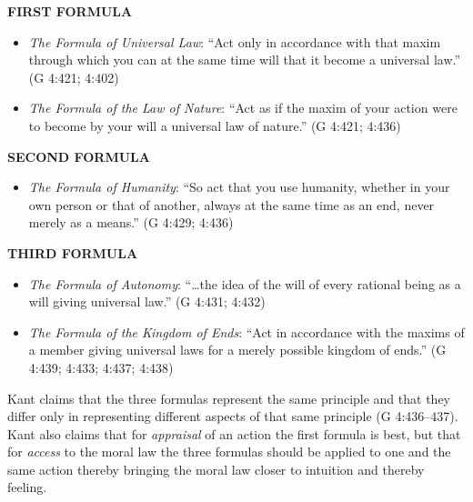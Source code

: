 \textbf{FIRST FORMULA}
\begin{itemize}
	\item \emph{The Formula of Universal Law}: ``Act only in accordance with that maxim through which you can at the same time will that it become a universal law.'' (G 4:421; 4:402)
	\item \emph{The Formula of the Law of Nature}: ``Act as if the maxim of your action were to become by your will a universal law of nature.'' (G 4:421; 4:436)
\end{itemize}
\textbf{SECOND FORMULA}
\begin{itemize}
	\item \emph{The Formula of Humanity}: ``So act that you use humanity, whether in your own person or that of another, always at the same time as an end, never merely as a means.'' (G 4:429; 4:436)
\end{itemize}
\textbf{THIRD FORMULA}
\begin{itemize}
	\item \emph{The Formula of Autonomy}: ``\ldots the idea of the will of every rational being as a will giving universal law.'' (G 4:431; 4:432)
	\item \emph{The Formula of the Kingdom of Ends}: ``Act in accordance with the maxims of a member giving universal laws for a merely possible kingdom of ends.'' (G 4:439; 4:433; 4:437; 4:438)
\end{itemize}

Kant claims that the three formulas represent the same principle and that they differ only in representing different aspects of that same principle (G 4:436–437). Kant also claims that for \emph{appraisal} of an action the first formula is best, but that for \emph{access} to the moral law the three formulas should be applied to one and the same action thereby bringing the moral law closer to intuition and thereby feeling.

% 

